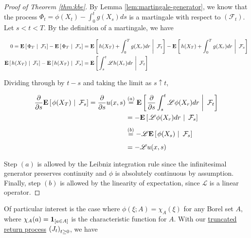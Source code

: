 \begin{proof}[Proof of Theorem \ref{thm:kbe}]
  By Lemma \ref{lem:martingale-generator}, we know that the process
  $\Phi_t = \phi(X_t) -  \int_0^tg(X_s)ds$ is a martingale with
  respect to $(\mathcal{F}_t)$. Let $s<t<T$. By the definition of a
  martingale, we have

  \begin{equation*}
    \small
    \begin{aligned}
      0 = \Expectation{}{\Conditional{\Phi_T}{\mathcal{F}_t}} -
      \Expectation{}{\Conditional{\Phi_T}{\mathcal{F}_s}} &=
    \Expectation{}{\Conditional{h(X_T) +
        \int_0^Tg(X_r)dr}{\mathcal{F}_t}} -
    \Expectation{}{\Conditional{h(X_T) + \int_0^Tg(X_r)dr}{\mathcal{F}_s}}\\
    \Expectation{}{\Conditional{h(X_T)}{\mathcal{F}_t}} -
    \Expectation{}{\Conditional{h(X_T)}{\mathcal{F}_s}} &=
    \Expectation{}{\Conditional{\int_s^t\mathscr{L}h(X_r)dr}{\mathcal{F}_t}}\\
    \end{aligned}
  \end{equation*}

  Dividing through by $t - s$ and taking the limit as $s\uparrow t$,

  \begin{equation*}
    \begin{aligned}
      \partialderiv{}{s}\Expectation{}{\Conditional{\phi(X_T)}{\mathcal{F}_s}}
      = \partialderiv{}{s}u(x, s)
      &\overset{(a)}{=}
      \Expectation{}{\Conditional{\partialderiv{}{s}\int_s^t\mathscr{L}\phi(X_r)dr}{\mathcal{F}_t}}\\
      &= -\Expectation{}{\Conditional{\mathscr{L}\phi(X_r)dr}{\mathcal{F}_s}}\\
      &\overset{(b)}{=}-\mathscr{L}\Expectation{}{\Conditional{\phi(X_s)}{\mathcal{F}_s}}\\
      &= -\mathscr{L}u(x, s)
    \end{aligned}
  \end{equation*}

  Step $(a)$ is allowed by the Leibniz integration rule since the
  infinitesimal generator preserves continuity and $\phi$ is
  absolutely continuous by assumption. Finally, step $(b)$ is allowed
  by the linearity of expectation, since $\mathscr{L}$ is a linear operator.
\end{proof}

Of particular interest is the case where $\phi(\xi; A) = \chi_A(\xi)$
for any Borel set $A$, where $\chi_A(a) = \indicator{a\in A}$ is the
characteristic function for $A$. With our
\hyperref[def:truncated-return]{truncated return process} 
$\indexedabove{t}{J}$, we have

